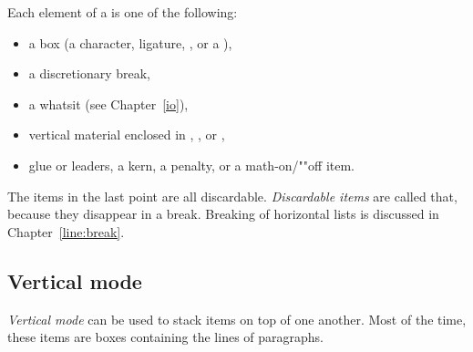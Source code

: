 \documentclass[twoside,letterpaper,openright]{rapport3}
\begin{document}
Each element of a  is one of the following:
\begin{itemize} \item a box (a character, ligature, ,
or a ),
\item a discretionary break,
\item a whatsit (see Chapter~\ref{io}),
\item vertical material enclosed in ,
, or ,
\item 
\mdqon
glue or leaders, a kern, a penalty, or a math-on/""off item.
\mdqoff
\end{itemize}
The items in the last point are all discardable.
\emph{Discardable items}
are called that, because they disappear in
a break. Breaking of horizontal
lists is discussed in Chapter~\ref{line:break}.

\subsection{Vertical mode}

\emph{Vertical mode}
can be used to stack items on top of one another.
Most of the time, these items are boxes 
containing the lines of paragraphs.
\end{document}
